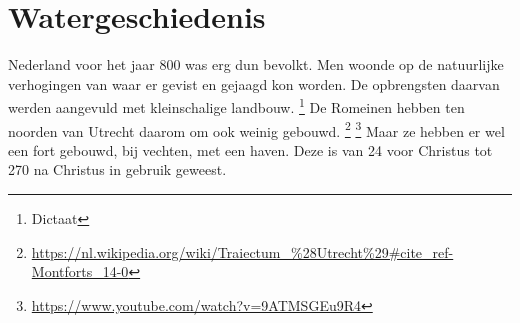 \section{Watergeschiedenis}

Nederland voor het jaar 800 was erg dun bevolkt.
Men woonde op de natuurlijke verhogingen van waar er gevist en gejaagd kon worden.
De opbrengsten daarvan werden aangevuld met kleinschalige landbouw.
\footnote{Dictaat}
De Romeinen hebben ten noorden van Utrecht daarom om ook weinig gebouwd.
\footnote{\url{https://nl.wikipedia.org/wiki/Traiectum_%28Utrecht%29#cite_ref-Montforts_14-0}}
\footnote{\url{https://www.youtube.com/watch?v=9ATMSGEu9R4}}
Maar ze hebben er wel een fort gebouwd, bij vechten, met een haven.
Deze is van 24 voor Christus tot 270 na Christus in gebruik geweest.

